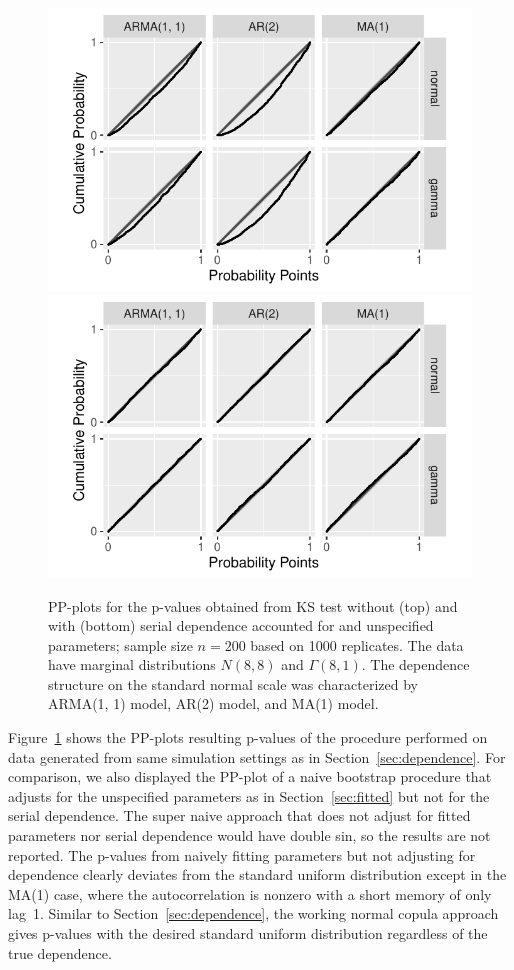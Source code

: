 \documentclass[12pt, letterpaper]{article}
\begin{document}
\begin{figure}[tbp]
  \centering
  \includegraphics[width=.75\textwidth]{pp_s_f.pdf}
  \includegraphics[width=.75\textwidth]{pp_ssf.pdf}
  \caption{PP-plots for the p-values obtained from KS test without (top) and 
	  with (bottom)
    serial dependence accounted for and unspecified parameters; sample size
    $n = 200$ based on
    1000 replicates. The data have marginal distributions $N(8, 8)$ and
    $\Gamma(8, 1)$. The dependence structure on the standard normal scale was
    characterized by ARMA(1, 1) model, AR(2) model, and MA(1) model.
  }
  \label{fig:pp_ssf}
\end{figure}

Figure~\ref{fig:pp_ssf} shows the PP-plots resulting p-values of the
procedure performed on data generated from same simulation settings as in
Section~\ref{sec:dependence}. For comparison, we also displayed the PP-plot of
a naive bootstrap procedure that adjusts for the unspecified parameters as in
Section~\ref{sec:fitted} but not for the serial dependence. 
The super naive approach that does not adjust for fitted parameters nor serial
dependence would have double sin, so the results are not reported. 
The p-values from
naively fitting parameters but not adjusting for dependence clearly deviates
from the standard uniform distribution except in the MA(1) case, where the
autocorrelation is nonzero with a short memory of only lag~1.
Similar to Section~\ref{sec:dependence}, the working normal copula approach
gives p-values with the desired standard uniform distribution regardless of the
true dependence.
\end{document}
